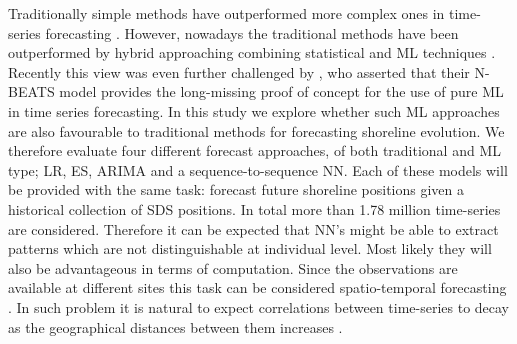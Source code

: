 \documentclass[format=sigconf, review=false, screen=true]{acmart}
\begin{document}
Traditionally simple methods have outperformed more complex ones in time-series forecasting \citep{Clements2001explaining, Makridakis2018m4}. However, nowadays the traditional methods have been outperformed by hybrid approaching combining statistical and ML techniques \citep{Smyl2020hybrid}. Recently this view was even further challenged by \citet{Oreshkin2020NBEATSNB}, who asserted that their N-BEATS model provides the long-missing proof of concept for the use of pure ML in time series forecasting. In this study we explore whether such ML approaches are also favourable to traditional methods for forecasting shoreline evolution. We therefore evaluate four different forecast approaches, of both traditional and ML type;  LR, ES, ARIMA and a sequence-to-sequence NN. Each of these models will be provided with the same task: forecast future shoreline positions given a historical collection of SDS positions. In total more than 1.78 million time-series are considered. Therefore it can be expected that NN's might be able to extract patterns which are not distinguishable at individual level. Most likely they will also be advantageous in terms of computation. Since the observations are available at different sites this task can be considered spatio-temporal forecasting \citep{pmlr-v89-mariet19a}. In such problem it is natural to expect correlations between time-series to decay as the geographical distances between them increases \cite{pmlr-v89-mariet19a}. 

     




\end{document}
